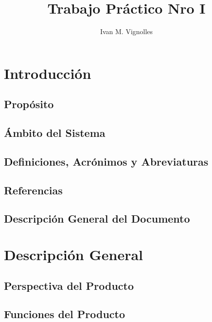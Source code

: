 \documentclass[11pt]{unc_so2}
\begin{document}
\title{Trabajo Práctico Nro I}
\author{Ivan M. Vignolles}

\maketitle[logo]


\nombrefecha
\tableofcontents*
\clearpage

\mainmatter

\section{Introducción}
\subsection{Propósito}
\subsection{Ámbito del Sistema}
\subsection{Definiciones, Acrónimos y Abreviaturas}
\subsection{Referencias}
\subsection{Descripción General del Documento}
\section{Descripción General}
\subsection{Perspectiva del Producto}
\subsection{Funciones del Producto}
\end{document}
